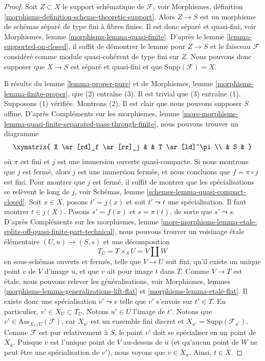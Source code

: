 \begin{proof}
Soit $Z \subset X$ le support schématique de $\mathcal{F}$, voir
Morphismes, définition \ref{morphisms-definition-scheme-theoretic-support}.
Alors $Z \to S$ est un morphisme de schémas séparé de type fini à
fibres finies. Il est donc séparé et quasi-fini, voir
Morphismes, lemme \ref{morphisms-lemma-quasi-finite}.
D'après le
lemme \ref{lemma-supported-on-closed},
il suffit de démontrer le lemme pour $Z \to S$ et le faisceau $\mathcal{F}$
considéré comme module quasi-cohérent de type fini sur $Z$. Nous pouvons donc
supposer que $X \to S$ est séparé et quasi-fini et que
$\text{Supp}(\mathcal{F}) = X$.

\medskip\noindent
Il résulte du
lemme \ref{lemma-proper-pure}
et de
Morphismes, lemme \ref{morphisms-lemma-finite-proper},
que (2) entraîne (3). Il est trivial que (3) entraîne (1). Supposons (1) vérifiée.
Montrons (2). Il est clair que nous pouvons supposer $S$ affine. D'après
Compléments sur les morphismes,
lemme \ref{more-morphisms-lemma-quasi-finite-separated-pass-through-finite},
nous pouvons trouver un diagramme
$$
\xymatrix{
X \ar[rd]_f \ar[rr]_j & & T \ar[ld]^\pi \\
& S &
}
$$
où $\pi$ est fini et $j$ est une immersion ouverte quasi-compacte.
Si nous montrons que $j$ est fermé, alors $j$ est une immersion fermée,
et nous concluons que $f = \pi \circ j$ est fini.
Pour montrer que $j$ est fermé, il suffit de montrer que les spécialisations
se relèvent le long de $j$, voir
Schémas, lemme \ref{schemes-lemma-quasi-compact-closed}.
Soit $x \in X$, posons $t' = j(x)$ et soit $t' \leadsto t$ une spécialisation.
Il faut montrer $t \in j(X)$. Posons $s' = f(x)$ et $s = \pi(t)$, de sorte que
$s' \leadsto s$. D'après
Compléments sur les morphismes, lemme
\ref{more-morphisms-lemma-etale-splits-off-quasi-finite-part-technical},
nous pouvons trouver un voisinage \'etale élémentaire
$(U, u) \to (S, s)$ et une décomposition
$$
T_U = T \times_S U = V \amalg W
$$
en sous-schémas ouverts et fermés, telle que $V \to U$ soit fini,
qu'il existe un unique point $v$ de $V$ d'image $u$, et que
$v$ ait pour image $t$ dans $T$. Comme $V \to T$ est \'etale, nous pouvons relever
les généralisations, voir
Morphismes, lemmes \ref{morphisms-lemma-generalizations-lift-flat} et
\ref{morphisms-lemma-etale-flat}.
Il existe donc une spécialisation $v' \leadsto v$ telle que $v'$
s'envoie sur $t' \in T$. En particulier, $v' \in X_U \subset T_U$.
Notons $u' \in U$ l'image de $t'$. Notons que
$v' \in \text{Ass}_{X_U/U}(\mathcal{F})$, car $X_{u'}$ est un ensemble
fini discret et $X_{u'} = \text{Supp}(\mathcal{F}_{u'})$.
Comme $\mathcal{F}$ est pur relativement à $S$, le point $v'$ doit
se spécialiser en un point de $X_u$. Puisque $v$ est l'unique point de
$V$ au-dessus de $u$ (et qu'aucun point de $W$ ne peut être une spécialisation
de $v'$), nous voyons que $v \in X_u$. Ainsi, $t \in X$.
\end{proof}

